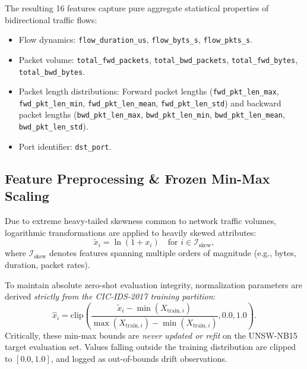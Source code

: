 The resulting 16 features capture pure aggregate statistical properties of bidirectional traffic flows:
\begin{itemize}
    \item Flow dynamics: \texttt{flow\_duration\_us}, \texttt{flow\_byts\_s}, \texttt{flow\_pkts\_s}.
    \item Packet volume: \texttt{total\_fwd\_packets}, \texttt{total\_bwd\_packets}, \texttt{total\_fwd\_bytes}, \texttt{total\_bwd\_bytes}.
    \item Packet length distributions: Forward packet lengths (\texttt{fwd\_pkt\_len\_max}, \texttt{fwd\_pkt\_len\_min}, \texttt{fwd\_pkt\_len\_mean}, \texttt{fwd\_pkt\_len\_std}) and backward packet lengths (\texttt{bwd\_pkt\_len\_max}, \texttt{bwd\_pkt\_len\_min}, \texttt{bwd\_pkt\_len\_mean}, \texttt{bwd\_pkt\_len\_std}).
    \item Port identifier: \texttt{dst\_port}.
\end{itemize}

\subsection{Feature Preprocessing & Frozen Min-Max Scaling}
Due to extreme heavy-tailed skewness common to network traffic volumes, logarithmic transformations are applied to heavily skewed attributes:
\begin{equation}
\tilde{x}_i = \ln(1 + x_i) \quad \text{for } i \in \mathcal{I}_{\text{skew}},
\end{equation}
where $\mathcal{I}_{\text{skew}}$ denotes features spanning multiple orders of magnitude (e.g., bytes, duration, packet rates).

To maintain absolute zero-shot evaluation integrity, normalization parameters are derived \emph{strictly from the CIC-IDS-2017 training partition}:
\begin{equation}
\hat{x}_i = \text{clip}\left(\frac{\tilde{x}_i - \min(X_{\text{train}, i})}{\max(X_{\text{train}, i}) - \min(X_{\text{train}, i})}, 0.0, 1.0\right).
\end{equation}
Critically, these min-max bounds are \emph{never updated or refit} on the UNSW-NB15 target evaluation set. Values falling outside the training distribution are clipped to $[0.0, 1.0]$, and logged as out-of-bounds drift observations.

